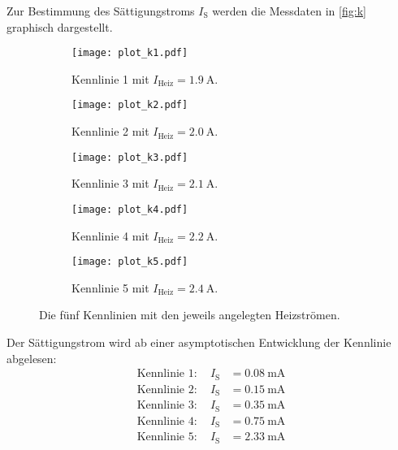 Zur Bestimmung des Sättigungstroms $I_{\text{S}}$ werden die Messdaten in \autoref{fig:k} graphisch dargestellt.
\begin{figure}
  \centering
  
  \begin{subfigure}{0.49\columnwidth}
  \centering
  \texttt{[image: plot\_k1.pdf]}
  \caption{Kennlinie 1 mit $I_\text{Heiz} = \qty{1,9}{\ampere}$.}
  \label{fig:k1}
  \end{subfigure}\hfill
  \begin{subfigure}{0.49\columnwidth}
  \centering
  \texttt{[image: plot\_k2.pdf]}
  \caption{Kennlinie 2 mit $I_\text{Heiz} = \qty{2,0}{\ampere}$.}
  \label{fig:k2}
  \end{subfigure}
  
  \medskip
  
  \begin{subfigure}{0.49\columnwidth}
  \centering
  \texttt{[image: plot\_k3.pdf]}
  \caption{Kennlinie 3 mit $I_\text{Heiz} = \qty{2,1}{\ampere}$.}
  \label{fig:k3}
  \end{subfigure}\hfill
  \begin{subfigure}{0.49\columnwidth}
  \centering
  \texttt{[image: plot\_k4.pdf]}
  \caption{Kennlinie 4 mit $I_\text{Heiz} = \qty{2,2}{\ampere}$.}
  \label{fig:k4}
  \end{subfigure}
  
  \medskip
  
  \begin{subfigure}{0.7\columnwidth}
  \centering
  \texttt{[image: plot\_k5.pdf]}
  \caption{Kennlinie 5 mit $I_\text{Heiz} = \qty{2,4}{\ampere}$.}
  \label{fig:k5}
  \end{subfigure}

  \caption{Die fünf Kennlinien mit den jeweils angelegten Heizströmen.}
  \label{fig:k}

\end{figure}

Der Sättigungstrom wird ab einer asymptotischen Entwicklung der Kennlinie abgelesen:
\begin{align*}
  \text{Kennlinie 1} : \quad I_\text{S} &= \qty{0,08}{\milli\ampere} \\
  \text{Kennlinie 2} : \quad I_\text{S} &= \qty{0,15}{\milli\ampere} \\
  \text{Kennlinie 3} : \quad I_\text{S} &= \qty{0,35}{\milli\ampere} \\
  \text{Kennlinie 4} : \quad I_\text{S} &= \qty{0,75}{\milli\ampere} \\
  \text{Kennlinie 5} : \quad I_\text{S} &= \qty{2,33}{\milli\ampere}
\end{align*}


